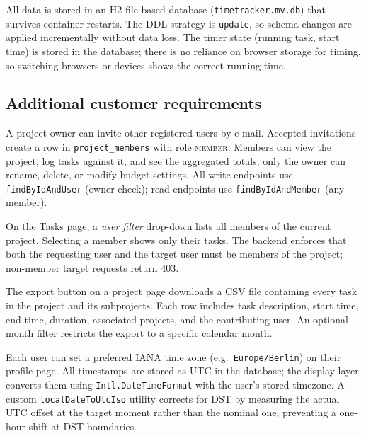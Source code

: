 \documentclass[a4paper, 12pt]{article}
\begin{document}
\begin{description}[leftmargin=0pt]
  \item[Data Persistence.]
    All data is stored in an H2 file-based database (\texttt{timetracker.mv.db}) that survives
    container restarts. The DDL strategy is \texttt{update}, so schema changes are applied
    incrementally without data loss. The timer state (running task, start time) is stored in
    the database; there is no reliance on browser storage for timing, so switching browsers or
    devices shows the correct running time.

\end{description}

\subsection{Additional customer requirements}

\begin{description}[leftmargin=0pt]

  \item[Project Sharing.]
    A project owner can invite other registered users by e-mail. Accepted invitations create
    a row in \texttt{project\_members} with role \textsc{member}. Members can view the project,
    log tasks against it, and see the aggregated totals; only the owner can rename, delete, or
    modify budget settings. All write endpoints use \texttt{findByIdAndUser} (owner check);
    read endpoints use \texttt{findByIdAndMember} (any member).

  \item[Shared Task Overview.]
    On the Tasks page, a \textit{user filter} drop-down lists all members of the current
    project. Selecting a member shows only their tasks. The backend enforces that both the
    requesting user and the target user must be members of the project; non-member target
    requests return 403.

  \item[Export.]
    The export button on a project page downloads a CSV file containing every task in the
    project and its subprojects. Each row includes task description, start time, end time,
    duration, associated projects, and the contributing user. An optional month filter
    restricts the export to a specific calendar month.

  \item[Time Zones.]
    Each user can set a preferred IANA time zone (e.g.\ \texttt{Europe/Berlin}) on their
    profile page. All timestamps are stored as UTC in the database; the display layer converts
    them using \texttt{Intl.DateTimeFormat} with the user's stored timezone. A custom
    \texttt{localDateToUtcIso} utility corrects for DST by measuring the actual UTC offset at
    the target moment rather than the nominal one, preventing a one-hour shift at DST
    boundaries.

\end{description}
\end{document}
